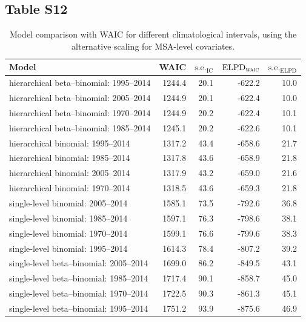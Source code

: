 \documentclass[draft]{agujournal}\usepackage{knitr}
\begin{document}
\subsection*{Table S12}
\begin{table}[H]
\centering
\begingroup\small
\begin{tabular}{p{3in}rrrr}
  \hline
Model & WAIC & $\text{s.e.}_{\text{IC}}$ & $\text{ELPD}_{\text{\scshape{waic}}}$ & $\text{s.e.}_{\text{ELPD}}$ \\ 
  \hline
hierarchical beta--binomial: 1995--2014 & 1244.4 & 20.1 & -622.2 & 10.0 \\ 
  hierarchical beta--binomial: 2005--2014 & 1244.9 & 20.1 & -622.4 & 10.0 \\ 
  hierarchical beta--binomial: 1970--2014 & 1244.9 & 20.2 & -622.4 & 10.1 \\ 
  hierarchical beta--binomial: 1985--2014 & 1245.1 & 20.2 & -622.6 & 10.1 \\ 
  hierarchical binomial: 1995--2014 & 1317.2 & 43.4 & -658.6 & 21.7 \\ 
  hierarchical binomial: 1985--2014 & 1317.8 & 43.6 & -658.9 & 21.8 \\ 
  hierarchical binomial: 2005--2014 & 1317.9 & 43.2 & -659.0 & 21.6 \\ 
  hierarchical binomial: 1970--2014 & 1318.5 & 43.6 & -659.3 & 21.8 \\ 
  single-level binomial: 2005--2014 & 1585.1 & 73.5 & -792.6 & 36.8 \\ 
  single-level binomial: 1985--2014 & 1597.1 & 76.3 & -798.6 & 38.1 \\ 
  single-level binomial: 1970--2014 & 1599.1 & 76.6 & -799.6 & 38.3 \\ 
  single-level binomial: 1995--2014 & 1614.3 & 78.4 & -807.2 & 39.2 \\ 
  single-level beta--binomial: 2005--2014 & 1699.0 & 86.2 & -849.5 & 43.1 \\ 
  single-level beta--binomial: 1985--2014 & 1717.4 & 90.1 & -858.7 & 45.0 \\ 
  single-level beta--binomial: 1970--2014 & 1722.5 & 90.3 & -861.3 & 45.1 \\ 
  single-level beta--binomial: 1995--2014 & 1751.2 & 93.9 & -875.6 & 46.9 \\ 
   \hline
\end{tabular}
\endgroup
\caption[Model comparison: WAIC (climatological interval using absolute MSA-level values).]{Model comparison with WAIC for different climatological intervals, using the alternative scaling for MSA-level covariates.} 
\label{tab:waic.years}
\end{table}
\end{document}
